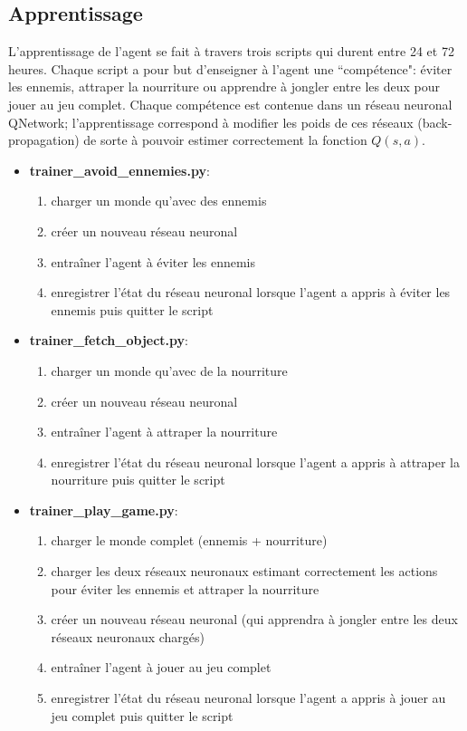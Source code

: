 \documentclass[11pt,a4paper]{report}
\begin{document}
  \subsection{Apprentissage}
    
  \par L'apprentissage de l'agent se fait à travers trois scripts qui durent entre 24 et 72 heures. Chaque script a pour but d'enseigner à l'agent une ``compétence": éviter les ennemis, attraper la nourriture ou apprendre à jongler entre les deux pour jouer au jeu complet. Chaque compétence est contenue dans un réseau neuronal QNetwork; l'apprentissage correspond à modifier les poids de ces réseaux (back-propagation) de sorte à pouvoir estimer correctement la fonction $Q(s,a)$.

  \renewcommand{\labelitemi}{\textbullet}
  \begin{itemize}
  \item \textbf{trainer\_avoid\_ennemies.py}: 
      \begin{enumerate}
      \item charger un monde qu'avec des ennemis
      \item créer un nouveau réseau neuronal 
      \item entraîner l'agent à éviter les ennemis
      \item enregistrer l'état du réseau neuronal lorsque l'agent  a appris à éviter les ennemis puis quitter le script
      \end{enumerate}
  \item \textbf{trainer\_fetch\_object.py}: 
      \begin{enumerate}
      \item charger un monde qu'avec de la nourriture
      \item créer un nouveau réseau neuronal
      \item entraîner l'agent à attraper la nourriture
      \item enregistrer l'état du réseau neuronal lorsque l'agent  a appris à attraper la nourriture puis quitter le script
      \end{enumerate}  
  \item \textbf{trainer\_play\_game.py}:
      \begin{enumerate}
      \item charger le monde complet (ennemis + nourriture)
      \item charger les deux réseaux neuronaux estimant correctement les actions pour éviter les ennemis et attraper la nourriture
      \item créer un nouveau réseau neuronal (qui apprendra à jongler entre les deux réseaux neuronaux chargés)
      \item entraîner l'agent à jouer au jeu complet
      \item enregistrer l'état du réseau neuronal lorsque l'agent  a appris à jouer au jeu complet puis quitter le script
      \end{enumerate}
  \end{itemize}
  
\end{document}
